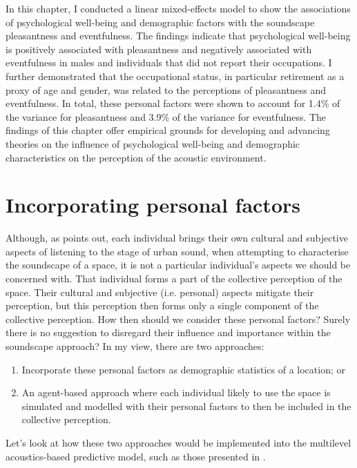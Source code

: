 In this chapter, I conducted a linear mixed-effects model to show the associations of psychological well-being and demographic factors with the soundscape pleasantness and eventfulness. The findings indicate that psychological well-being is positively associated with pleasantness and negatively associated with eventfulness in males and individuals that did not report their occupations. I further demonstrated that the occupational status, in particular retirement as a proxy of age and gender, was related to the perceptions of pleasantness and eventfulness. In total, these personal factors were shown to account for 1.4\% of the variance for pleasantness and 3.9\% of the variance for eventfulness. The findings of this chapter offer empirical grounds for developing and advancing theories on the influence of psychological well-being and demographic characteristics on the perception of the acoustic environment.



\section{Incorporating personal factors}
Although, as \citet{Droumeva2021sound} points out, each individual brings their own cultural and subjective aspects of listening to the stage of urban sound, when attempting to characterise the soundscape of a space, it is not a particular individual's aspects we should be concerned with. That individual forms a part of the collective perception of the space. Their cultural and subjective (i.e. personal) aspects mitigate their perception, but this perception then forms only a single component of the collective perception. How then should we consider these personal factors? Surely there is no suggestion to disregard their influence and importance within the soundscape approach? In my view, there are two approaches:

\begin{enumerate}
  \item Incorporate these personal factors as demographic statistics of a location; or
  \item An agent-based approach where each individual likely to use the space is simulated and modelled with their personal factors to then be included in the collective perception.
\end{enumerate}

Let's look at how these two approaches would be implemented into the multilevel acoustics-based predictive model, such as those presented in .

